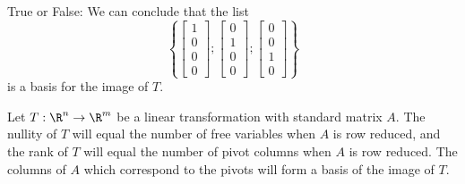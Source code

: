 True or False: We can conclude that the list
\[ \left\{ \left[\begin{array}{c} 1 \\ 0 \\ 0 \\ 0
\end{array} \right];  
\left[\begin{array}{c} 0 \\ 1 \\ 0 \\ 0
\end{array} \right];  \left[\begin{array}{c} 0 \\ 0 \\ 1 \\ 0
\end{array} \right] \right\} \]
is a basis for the image of $T$.  





\endedxproblem






\endedxvertical





Let $T: \R^{n}\rightarrow \R^{m}$ be a linear transformation with standard matrix $A$. 
The nullity of $T$ will equal the number of free variables when $A$ is row reduced, and the
rank of $T$ will equal the number of pivot columns when $A$ is row reduced.  The columns of $A$ which
correspond to the pivots will form a basis of the image of $T$.  


\endedxtext

\endedxvertical

